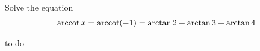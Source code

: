 Solve the equation 
\begin{align*}
\operatorname{arccot} x = \operatorname{arccot} (-1) = \arctan 2 + \arctan 3 + \arctan 4
\end{align*}

\begin{answer}
to do
\end{answer}
